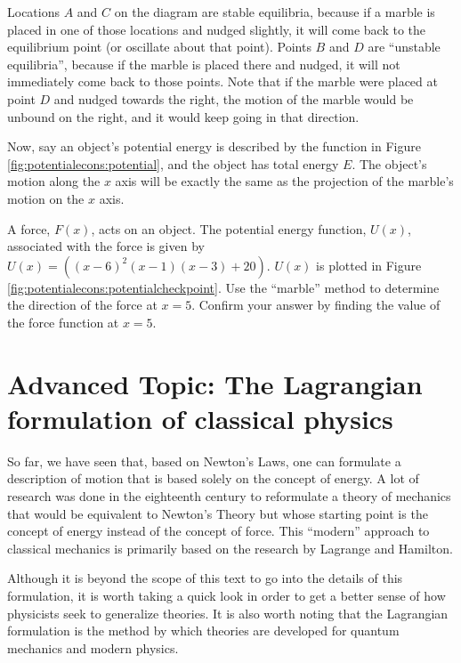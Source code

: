 Locations $A$ and $C$ on the diagram are stable equilibria, because if a marble is placed in one of those locations and nudged slightly, it will come back to the equilibrium point (or oscillate about that point). Points $B$ and $D$ are ``unstable equilibria'', because if the marble is placed there and nudged, it will not immediately come back to those points. Note that if the marble were placed at point $D$ and nudged towards the right, the motion of the marble would be unbound on the right, and it would keep going in that direction. 


Now, say an object's potential energy is described by the function in Figure \ref{fig:potentialecons:potential}, and the object has total energy $E$. The object's motion along the $x$ axis will be exactly the same as the projection of the marble's motion on the $x$ axis.

\begin{checkpoint}
A force, $F(x)$, acts on an object. The potential energy function, $U(x)$, associated with the force is given by $U(x)=((x-6)^2(x-1)(x-3)+20)$. $U(x)$ is plotted in Figure \ref{fig:potentialecons:potentialcheckpoint}. Use the ``marble'' method to determine the direction of the force at $x=5$. Confirm your answer by finding the value of the force function at $x=5$.
\end{checkpoint}

\section{Advanced Topic: The Lagrangian formulation of classical physics}
So far, we have seen that, based on Newton's Laws, one can formulate a description of motion that is based solely on the concept of energy. A lot of research was done in the eighteenth century to reformulate a theory of mechanics that would be equivalent to Newton's Theory but whose starting point is the concept of energy instead of the concept of force. This ``modern'' approach to classical mechanics is primarily based on the research by Lagrange and Hamilton. 

Although it is beyond the scope of this text to go into the details of this formulation, it is worth taking a quick look in order to get a better sense of how physicists seek to generalize theories. It is also worth noting that the Lagrangian formulation is the method by which theories are developed for quantum mechanics and modern physics. 

